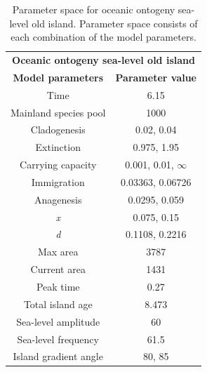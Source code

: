\begin{table}[h]
    \centering
    \caption{Parameter space for oceanic ontogeny sea-level old island. Parameter space consists of each combination of the model parameters.}
    \begin{tabular}{ c | c }
        \multicolumn{2}{c}{\textbf{Oceanic ontogeny sea-level old island}} \\
        \textbf{Model parameters} & \textbf{Parameter value} \\ 
        \hline
        \hline
        Time & 6.15 \\
        \hline
        Mainland species pool & 1000 \\
        \hline
        Cladogenesis & 0.02, 0.04 \\
        \hline
        Extinction & 0.975, 1.95 \\
        \hline
        Carrying capacity & 0.001, 0.01, $\infty$ \\
        \hline
        Immigration & 0.03363, 0.06726 \\
        \hline
        Anagenesis & 0.0295, 0.059 \\
        \hline
        \textit{x} & 0.075, 0.15 \\
        \hline
        \textit{d} & 0.1108, 0.2216 \\
        \hline
        Max area & 3787 \\
        \hline
        Current area & 1431 \\
        \hline
        Peak time & 0.27 \\
        \hline
        Total island age & 8.473 \\
        \hline
        Sea-level amplitude & 60 \\
        \hline
        Sea-level frequency & 61.5 \\
        \hline
        Island gradient angle & 80, 85 \\
    \end{tabular}
    \label{tab:oceanic_ontogeny_sea_level_young}
\end{table}

